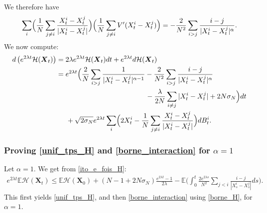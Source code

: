 \documentclass[JEP,XML,SOM,Unicode,published]{cedram}
\newcommand{\bX}{{\boldsymbol{X}}}
\theoremstyle{plain}
\theoremstyle{definition}
\begin{document}
We therefore have
\[
\sum_i\Bigl(\frac{1}{N}\sum_{j\neq i}\frac{X^i_t-X^j_t}{|X^i_t-X^j_t|}\Bigr)\Bigl(\frac{1}{N}\sum_{j\neq i}V'(X^i_t-X^j_t)\Bigr)=-\frac{2}{N^2}\sum_{i>j}\frac{i-j}{|X^i_t-X^j_t|^{\alpha}}.
\]
We now compute:
\begin{equation}\label{ito_e_fois_H}
\begin{aligned}
d\left(e^{2\lambda t}\mathcal{H}(\bX_t)\right)&=2\lambda e^{2\lambda t}\mathcal{H}(\bX_t)dt+e^{2\lambda t}d\mathcal{H}(\bX_t)\\
&=e^{2\lambda t}\Bigl(\frac{2}{N}\sum_{i>j}\frac{1}{|X^i_t-X^j_t|^{\alpha-1}}-\frac{2}{N^2}\sum_{i>j}\frac{i-j}{|X^i_t-X^j_t|^{\alpha}}\\
&\hspace*{4.5cm}-\frac{\lambda}{2N}\sum_{i\neq j}|X^i_t-X^j_t|+2N\sigma_N\Bigr)dt\\
&\hspace*{.5cm}+\sqrt{2\sigma_N}e^{2\lambda t}\sum_i\Bigl(2X^i_t-\frac{1}{N}\sum_{j\neq i}\frac{X^i_t-X^j_t}{|X^i_t-X^j_t|}\Bigr)dB^i_t.
\end{aligned}
\end{equation}

\subsubsection*{Proving \eqref{unif_tps_H} and \eqref{borne_interaction} for $\alpha=1$} Let $\alpha=1$. We get from \eqref{ito_e_fois_H}:
\begin{align*}
e^{2\lambda t}\mathbb{E}\mathcal{H}(\bX_t)\leq \mathbb{E}\mathcal{H}(\bX_0)\!+\!(N\!-\!1\!+\!2N\sigma_N)\frac{e^{2\lambda t}-1}{2\lambda}-\mathbb{E}\biggl(\int_0^t\!\frac{2e^{2\lambda s}}{N^2}\sum_{j<i}\frac{i-j}{|X^i_s-X^j_s|}ds\biggr).
\end{align*}
This first yields \eqref{unif_tps_H}, and then \eqref{borne_interaction} using \eqref{borne_H}, for $\alpha=1$.
\end{document}
